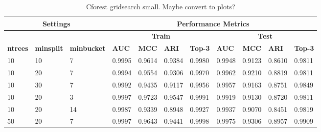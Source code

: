 \begin{table}[htp]
    \centering
    \begin{tabular}{|p{1.5cm}|p{2cm}|p{2cm}||p{1cm}|p{1cm}|p{1cm}|p{1.2cm}||p{1cm}|p{1cm}|p{1cm}|p{1.2cm}|}
        \hline
        \multicolumn{3}{|c||}{\textbf{Settings}} & \multicolumn{8}{|c|}{\textbf{Performance Metrics}}  \\
        \hline
        \multicolumn{3}{|c||}{} & \multicolumn{4}{|c||}{\textbf{Train}} & \multicolumn{4}{|c|}{\textbf{Test}} \\
        \hline
        \hline
        \textbf{ntrees} & \textbf{minsplit} & \textbf{minbucket} & \textbf{AUC} & \textbf{MCC} & \textbf{ARI} & \textbf{Top-3} & \textbf{AUC} & \textbf{MCC} & \textbf{ARI} & \textbf{Top-3} \\
        \hline
        10 & 10 & 7 & 0.9995 & 0.9614 & 0.9384 & 0.9980 & 0.9948 & 0.9123 & 0.8610 & 0.9811 \\
        \hline
        10 & 20 & 7 & 0.9994 & 0.9554 & 0.9306 & 0.9970 & 0.9962 & 0.9210 & 0.8819 & 0.9811 \\
        \hline
        10 & 30 & 7 & 0.9992 & 0.9435 & 0.9117 & 0.9956 & 0.9957 & 0.9163 & 0.8751 & 0.9849 \\
        \hline
        10 & 20 & 3 & 0.9997 & 0.9723 & 0.9547 & 0.9991 & 0.9919 & 0.9130 & 0.8720 & 0.9811 \\
        \hline
        10 & 20 & 14 & 0.9987 & 0.9339 & 0.8948 & 0.9927 & 0.9937 & 0.9070 & 0.8451 & 0.9819 \\
        \hline
        50 & 20 & 7 & 0.9997 & 0.9643 & 0.9441 & 0.9998 & 0.9975 & 0.9306 & 0.8957 & 0.9909 \\
        \hline
    \end{tabular}
    \caption{Cforest gridsearch small. Maybe convert to plots?}
    \label{tab:cforest_gs}
\end{table}
